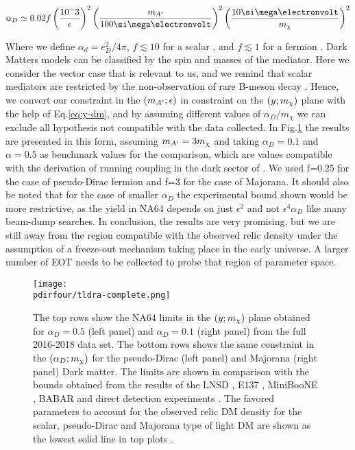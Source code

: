 \begin{equation}
  \label{eq:ad-freeze-out}
  \alpha_D \simeq 0.02 f\left(\frac{10^-3}{\epsilon}\right)^2\left(\frac{m_{\DM}}{100 \mev}\right)^2\left(\frac{10 \mev}{m_{\chi}}\right)^2
\end{equation}

Where we define $\alpha_d = e^2_D/4\pi$, $f\lesssim 10$ for a scalar \cite{deNiverville:2011it}, and $f\lesssim 1$ for a fermion \cite{PhysRevD.91.094026}. Dark Matters models can be classified by the spin and masses of the mediator. Here we consider the vector case that is relevant to us, and we remind that scalar mediators are restricted by the non-observation of rare B-meson decay \cite{battaglieri2017cosmic}. Hence, we convert our constraint in the $(m_{A'};\epsilon)$ in constraint on the $(y;m_{\chi})$ plane with the help of Eq.\ref{eq:y-dm}, and by assuming different values of $\alpha_D$/$m_{\chi}$ we can exclude all hypothesis not compatible with the data collected. In Fig.\ref{fig:dm-alpha-excl} the results are presented in this form, assuming $m_{A'} = 3m_{\chi}$ and taking $\alpha_D=0.1$ and $\alpha=0.5$ as benchmark values for the comparison, which are values compatible with the derivation of running coupling in the dark sector of \cite{Davoudiasl:2015hxa}. We used f=0.25 for the case of pseudo-Dirac fermion and f=3 for the case of Majorana. It should also be noted that for the case of smaller $\alpha_D$ the experimental bound shown would be more restrictive, as the yield in NA64 depends on just $\epsilon^2$ and not $\epsilon^4 \alpha_D$ like many beam-dump searches. In conclusion, the results are very promising, but we are still away from the region compatible with the observed relic density under the assumption of a freeze-out mechanism taking place in the early universe. A larger number of EOT needs to be collected to probe that region of parameter space.

\begin{figure}[bth!]
  \centering
  \texttt{[image: \\pdirfour/tldra-complete.png]}
  \caption{The top rows show the NA64 limits in the $(y;m_{\chi})$ plane obtained for $\alpha_D = 0.5$ (left panel) and $\alpha_D = 0.1$ (right panel) from the full 2016-2018 data set. The bottom rows shows the same constraint in the $(\alpha_D;m_{\chi})$ for the pseudo-Dirac (left panel) and Majorana (right panel) Dark matter. The limits are shown in comparison with the bounds obtained from the results of the LNSD \cite{deNiverville:2011it}, E137 \cite{e137}, MiniBooNE \cite{Aguilar-Arevalo:2018wea}, BABAR \cite{babar1} and direct detection experiments \cite{Essig:2012yx}. The favored parameters to account for the observed relic DM density for the scalar, pseudo-Dirac and Majorana type of light DM are shown as the lowest solid line in top plots \cite{Berlin:2018bsc}.}
  \label{fig:dm-alpha-excl}
\end{figure}

